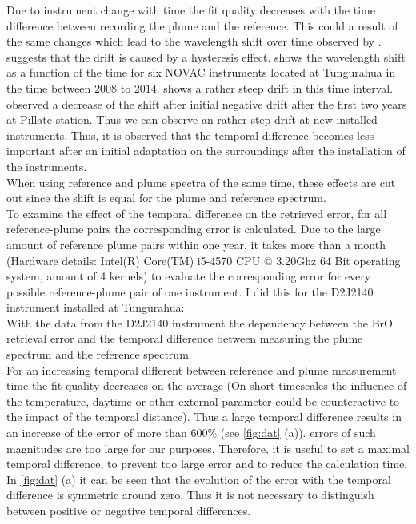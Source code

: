 Due to instrument change with time the fit quality decreases with the time difference between recording the plume and the reference. This could a result of the same changes which lead to the wavelength shift over time observed by \citet{WarnachSimon}.  \citet{WarnachSimon} suggests that the drift is caused by a hysteresis effect.  shows the wavelength shift as a function of the time for six NOVAC instruments located at Tungurahua in the time between 2008 to 2014.  shows a rather steep drift in this time interval.
\citet{WarnachSimon} observed a decrease of the shift after initial negative drift after the first two years at Pillate station. Thus we can observe an rather step drift at new installed instruments. Thus, it is observed that the temporal difference becomes less important after an initial adaptation on the surroundings after the installation of the instruments.\\
When using reference and plume spectra of the same time, these effects are cut out since the shift is equal for the plume and reference spectrum.\\
To examine the effect of the temporal difference on the retrieved  error, for all reference-plume pairs the corresponding  error is calculated. Due to the large amount of reference plume pairs within one year, it takes more than a month (Hardware details: Intel(R) Core(TM) i5-4570 CPU @ 3.20Ghz 64 Bit operating system, amount of 4 kernels) to evaluate the corresponding  error for every possible reference-plume pair of one instrument. I did this for the  D2J2140 instrument installed at Tungurahua:\\
With the data from the D2J2140 instrument the dependency between the BrO retrieval error and the temporal difference between measuring the plume spectrum and the reference spectrum.\\
For an increasing temporal different between reference and plume measurement time the fit quality decreases on the average (On short timescales the influence of the temperature, daytime or other external parameter could be counteractive to the impact of the temporal distance). Thus a large temporal difference results in an increase of the   error of more than 600\% (see \cref{fig:dat} (a)).
 errors of such magnitudes are too large for our purposes. Therefore, it is useful to set a maximal temporal difference, to prevent too large  error and to reduce the calculation time.
%
In \cref{fig:dat} (a) it can be seen that the evolution of the   error with the temporal difference is symmetric around zero. Thus it is not necessary to distinguish between positive or negative temporal differences.
